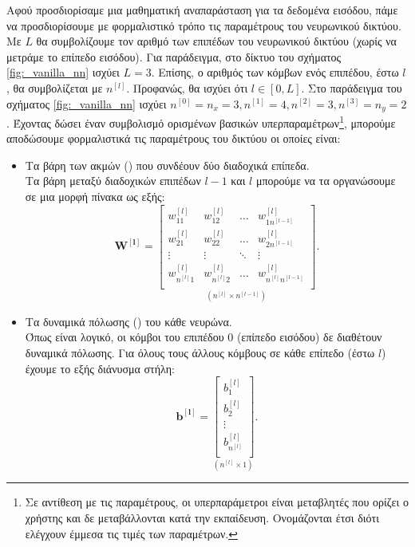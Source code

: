 Αφού προσδιορίσαμε μια μαθηματική αναπαράσταση για τα δεδομένα εισόδου, πάμε να προσδιορίσουμε με φορμαλιστικό τρόπο τις παραμέτρους του νευρωνικού δικτύου. Με $L$ θα συμβολίζουμε τον αριθμό των επιπέδων του νευρωνικού δικτύου (χωρίς να μετράμε το επίπεδο εισόδου). Για παράδειγμα, στο δίκτυο του σχήματος \ref{fig:_vanilla_nn} ισχύει $L=3$. Επίσης, ο αριθμός των κόμβων ενός επιπέδου, έστω $l$, θα συμβολίζεται με $n^{[l]}$. Προφανώς, θα ισχύει ότι $l \in [0,L]$. Στο παράδειγμα του σχήματος \ref{fig:_vanilla_nn} ισχύει $n^{[0]}=n_x=3, n^{[1]}=4, n^{[2]}=3, n^{[3]}=n_y=2$. Έχοντας δώσει έναν συμβολισμό ορισμένων βασικών υπερπαραμέτρων\footnote{Σε αντίθεση με τις παραμέτρους, οι υπερπαράμετροι είναι μεταβλητές που ορίζει ο χρήστης και δε μεταβάλλονται κατά την εκπαίδευση. Ονομάζονται έτσι διότι ελέγχουν έμμεσα τις τιμές των παραμέτρων.}, μπορούμε αποδώσουμε φορμαλιστικά τις παραμέτρους του δικτύου οι οποίες είναι:
\begin{itemize}
    \item Τα βάρη των ακμών () που συνδέουν δύο διαδοχικά επίπεδα.\\
    Τα βάρη μεταξύ διαδοχικών επιπέδων $l-1$ και $l$ μπορούμε να τα οργανώσουμε σε μια μορφή πίνακα ως εξής:
    \begin{equation}
        \boldsymbol{W^{[l]}} =
        \underset{(n^{[l]} \times n^{[l-1]})}{\begin{bmatrix}
            w^{[l]}_{11}&w^{[l]}_{12}& \dots&w^{[l]}_{1n^{[l-1]}} \\[0.5em]
            w^{[l]}_{21}&w^{[l]}_{22}& \dots&w^{[l]}_{2n^{[l-1]}}\\[0.3em]
            \vdots & \vdots& \ddots& \vdots \\[0.3em]
            w^{[l]}_{n^{[l]}1}&w^{[l]}_{n^{[l]}2}& \dots&w^{[l]}_{n^{[l]}n^{[l-1]}}\\[0.5em]
        \end{bmatrix}}.
    \end{equation}
    \item Τα δυναμικά πόλωσης () του κάθε νευρώνα. \\
    Όπως είναι λογικό, οι κόμβοι του επιπέδου $0$ (επίπεδο εισόδου) δε διαθέτουν δυναμικά πόλωσης. Για όλους τους άλλους κόμβους σε κάθε επίπεδο (έστω $l$) έχουμε το εξής διάνυσμα στήλη:
    \begin{equation}
        \boldsymbol{b^{[l]}} = 
        \underset{(n^{[l]} \times 1)}{
            \begin{bmatrix}
                b^{[l]}_1 \\[0.3em]
                b^{[l]}_2 \\[0.3em]
                \vdots \\[0.3em]
                b^{[l]}_{n^{[l]}}\\[0.3em]
            \end{bmatrix}}.
    \end{equation}
\end{itemize}

